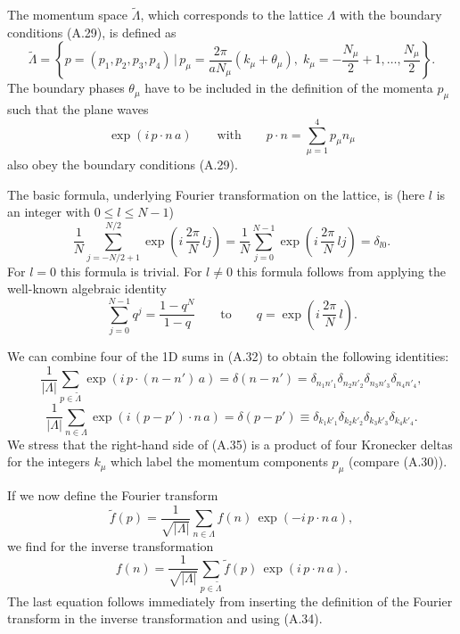 The momentum space $\tilde{\Lambda}$, which corresponds to the lattice
$\Lambda$ with the boundary conditions (A.29), is defined as
\begin{equation}
  \tilde{\Lambda} = \left\{ p = (p_1, p_2, p_3, p_4) \,\Big|\, p_\mu =
  \frac{2\pi}{aN_\mu}(k_\mu + \theta_\mu),\; k_\mu = -\frac{N_\mu}{2} + 1, \ldots, \frac{N_\mu}{2} \right\}.
\end{equation}
The boundary phases $\theta_\mu$ have to be included in the definition of the
momenta $p_\mu$ such that the plane waves
\begin{equation}
  \exp(i\,p\cdot n\,a) \qquad \text{with} \qquad p\cdot n = \sum_{\mu=1}^{4}p_\mu n_\mu
\end{equation}
also obey the boundary conditions (A.29).

The basic formula, underlying Fourier transformation on the lattice, is (here
$l$ is an integer with $0 \le l \le N - 1$)
\begin{equation}
  \frac{1}{N}\sum_{j=-N/2+1}^{N/2}\exp\!\left(i\,\frac{2\pi}{N}\,lj\right)
  = \frac{1}{N}\sum_{j=0}^{N-1}\exp\!\left(i\,\frac{2\pi}{N}\,lj\right) = \delta_{l0}.
\end{equation}
For $l = 0$ this formula is trivial. For $l \ne 0$ this formula follows from
applying the well-known algebraic identity
\begin{equation}
  \sum_{j=0}^{N-1}q^j = \frac{1 - q^N}{1 - q} \qquad \text{to} \qquad
  q = \exp\!\left(i\,\frac{2\pi}{N}\,l\right).
\end{equation}

We can combine four of the 1D sums in (A.32) to obtain the following
identities:
\begin{equation}
  \frac{1}{|\Lambda|}\sum_{p\in\tilde{\Lambda}}\exp\!\left(i\,p\cdot(n-n')\,a\right)
  = \delta(n-n') = \delta_{n_1n'_1}\delta_{n_2n'_2}\delta_{n_3n'_3}\delta_{n_4n'_4},
\end{equation}
\begin{equation}
  \frac{1}{|\Lambda|}\sum_{n\in\Lambda}\exp\!\left(i\,(p-p')\cdot n\,a\right)
  = \delta(p-p') \equiv \delta_{k_1k'_1}\delta_{k_2k'_2}\delta_{k_3k'_3}\delta_{k_4k'_4}.
\end{equation}
We stress that the right-hand side of (A.35) is a product of four Kronecker
deltas for the integers $k_\mu$ which label the momentum components $p_\mu$
(compare (A.30)).

If we now define the Fourier transform
\begin{equation}
  \tilde{f}(p) = \frac{1}{\sqrt{|\Lambda|}}\sum_{n\in\Lambda}f(n)\,\exp(-i\,p\cdot n\,a),
\end{equation}
we find for the inverse transformation
\begin{equation}
  f(n) = \frac{1}{\sqrt{|\Lambda|}}\sum_{p\in\tilde{\Lambda}}\tilde{f}(p)\,\exp(i\,p\cdot n\,a).
\end{equation}
The last equation follows immediately from inserting the definition of the
Fourier transform in the inverse transformation and using (A.34).

